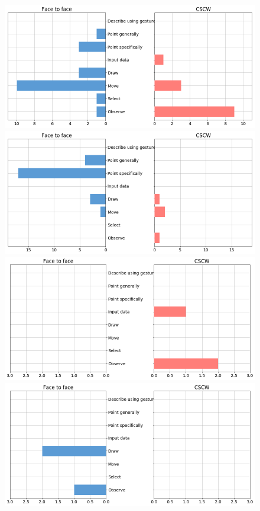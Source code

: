 \documentclass[12pt,twoside]{article}
\begin{document}
\begin{figure}
  \includegraphics[width=\linewidth]{img/Object.png}
  \includegraphics[width=\linewidth]{img/Position.png}
  \includegraphics[width=\linewidth]{img/Time.png}
\endminipage\hfill
{}
  \includegraphics[width=\linewidth]{img/Scale.png}

\end{figure}
\end{document}
